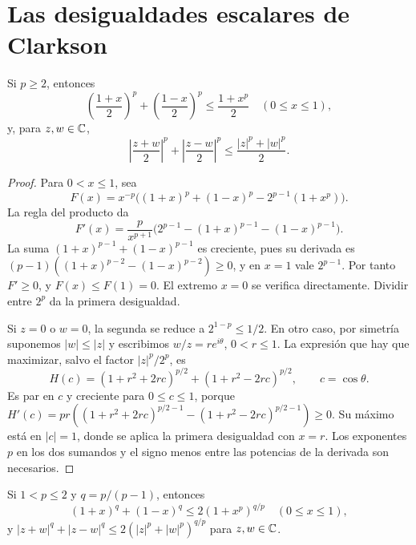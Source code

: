 \section{Las desigualdades escalares de Clarkson}
\begin{lema}\label{v2:clarkson-escalar-mayor}
Si $p\ge2$, entonces
\[
 \left(\frac{1+x}{2}\right)^p+\left(\frac{1-x}{2}\right)^p\le\frac{1+x^p}{2}\quad(0\le x\le1),
\]
y, para $z,w\in\mathbb C$,
\[
 \left|\frac{z+w}{2}\right|^p+\left|\frac{z-w}{2}\right|^p
 \le\frac{|z|^p+|w|^p}{2}.
\]
\end{lema}
\begin{proof}
Para $0<x\le1$, sea
\[
 F(x)=x^{-p}\bigl((1+x)^p+(1-x)^p-2^{p-1}(1+x^p)\bigr).
\]
La regla del producto da
\[
 F'(x)=\frac p{x^{p+1}}\bigl(2^{p-1}-(1+x)^{p-1}-(1-x)^{p-1}\bigr).
\]
La suma $(1+x)^{p-1}+(1-x)^{p-1}$ es creciente, pues su derivada es $(p-1)((1+x)^{p-2}-(1-x)^{p-2})\ge0$, y en $x=1$ vale $2^{p-1}$. Por tanto $F'\ge0$, y $F(x)\le F(1)=0$. El extremo $x=0$ se verifica directamente. Dividir entre $2^p$ da la primera desigualdad.

Si $z=0$ o $w=0$, la segunda se reduce a $2^{1-p}\le1/2$. En otro caso, por simetría suponemos $|w|\le|z|$ y escribimos $w/z=re^{i\theta}$, $0<r\le1$. La expresión que hay que maximizar, salvo el factor $|z|^p/2^p$, es
\[
 H(c)=(1+r^2+2rc)^{p/2}+(1+r^2-2rc)^{p/2},\qquad c=\cos\theta.
\]
Es par en $c$ y creciente para $0\le c\le1$, porque
$H'(c)=pr((1+r^2+2rc)^{p/2-1}-(1+r^2-2rc)^{p/2-1})\ge0$.
Su máximo está en $|c|=1$, donde se aplica la primera desigualdad con $x=r$. Los exponentes $p$ en los dos sumandos y el signo menos entre las potencias de la derivada son necesarios.
\end{proof}
\begin{lema}\label{v2:clarkson-escalar-menor}
Si $1<p\le2$ y $q=p/(p-1)$, entonces
\[
 (1+x)^q+(1-x)^q\le2(1+x^p)^{q/p}\quad(0\le x\le1),
\]
y $|z+w|^q+|z-w|^q\le2(|z|^p+|w|^p)^{q/p}$ para $z,w\in\mathbb C$.
\end{lema}
